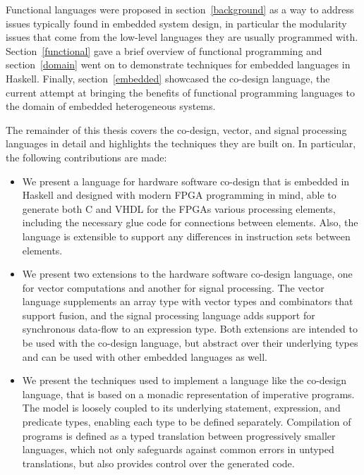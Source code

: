 \documentclass[../paper.tex]{subfiles}
\begin{document}
Functional languages were proposed in section~\ref{background} as a way to address issues typically found in embedded system design, in particular the modularity issues that come from the low-level languages they are usually programmed with. Section~\ref{functional} gave a brief overview of functional programming and section~\ref{domain} went on to demonstrate techniques for embedded languages in Haskell. Finally, section~\ref{embedded} showcased the co-design language, the current attempt at bringing the benefits of functional programming languages to the domain of embedded heterogeneous systems.

The remainder of this thesis covers the co-design, vector, and signal processing languages in detail and highlights the techniques they are built on. In particular, the following contributions are made:

\begin{itemize}
\item We present a language for hardware software co-design that is embedded in Haskell and designed with modern FPGA programming in mind, able to generate both C and VHDL for the FPGAs various processing elements, including the necessary glue code for connections between elements. Also, the language is extensible to support any differences in instruction sets between elements.

\item We present two extensions to the hardware software co-design language, one for vector computations and another for signal processing. The vector language supplements an array type with vector types and combinators that support fusion, and the signal processing language adds support for synchronous data-flow to an expression type. Both extensions are intended to be used with the co-design language, but abstract over their underlying types and can be used with other embedded languages as well.

\item We present the techniques used to implement a language like the co-design language, that is based on a monadic representation of imperative programs. The model is loosely coupled to its underlying statement, expression, and predicate types, enabling each type to be defined separately. Compilation of programs is defined as a typed translation between progressively smaller languages, which not only safeguards against common errors in untyped translations, but also provides control over the generated code.

\end{itemize}
\end{document}
